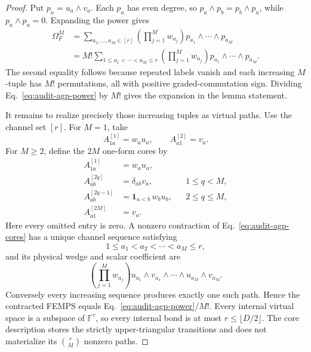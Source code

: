 \documentclass[aps,pra,reprint,superscriptaddress,nofootinbib,longbibliography,showkeys]{revtex4-2}
\theoremstyle{definition}
\begin{document}
\begin{proof}
Put $p_a=u_a\wedge v_a$.  Each $p_a$ has even degree, so
$p_a\wedge p_b=p_b\wedge p_a$, while $p_a\wedge p_a=0$.  Expanding the power
gives
\begin{align}
\Omega_F^M
&=\sum_{a_1,\ldots,a_M\in[r]}
\left(\prod_{j=1}^{M}w_{a_j}\right)
p_{a_1}\wedge\cdots\wedge p_{a_M}\nonumber\\
&=M!\sum_{1\le a_1<\cdots<a_M\le r}
\left(\prod_{j=1}^{M}w_{a_j}\right)
p_{a_1}\wedge\cdots\wedge p_{a_M}.
\label{eq:audit-agp-power}
\end{align}
The second equality follows because repeated labels vanish and each increasing
$M$-tuple has $M!$ permutations, all with positive graded-commutation sign.
Dividing Eq.~\eqref{eq:audit-agp-power} by $M!$ gives the expansion in the
lemma statement.

It remains to realize precisely those increasing tuples as virtual paths.
Use the channel set $[r]$.  For $M=1$, take
\begin{equation}
A^{[1]}_{1a}=w_au_a,\qquad A^{[2]}_{a1}=v_a.
\end{equation}
For $M\ge2$, define the $2M$ one-form cores by
\begin{align}
A^{[1]}_{1a}&=w_au_a,\nonumber\\
A^{[2q]}_{ab}&=\delta_{ab}v_a,
&&1\le q<M,\nonumber\\
A^{[2q-1]}_{ab}&=\mathbf 1_{a<b}\,w_bu_b,
&&2\le q\le M,\nonumber\\
A^{[2M]}_{a1}&=v_a.
\label{eq:audit-agp-cores}
\end{align}
Here every omitted entry is zero.  A nonzero contraction of
Eq.~\eqref{eq:audit-agp-cores} has a unique channel sequence satisfying
\begin{equation}
1\le a_1<a_2<\cdots<a_M\le r,
\end{equation}
and its physical wedge and scalar coefficient are
\begin{equation}
\left(\prod_{j=1}^{M}w_{a_j}\right)
u_{a_1}\wedge v_{a_1}\wedge\cdots\wedge
u_{a_M}\wedge v_{a_M}.
\end{equation}
Conversely every increasing sequence produces exactly one such path.  Hence
the contracted FEMPS equals Eq.~\eqref{eq:audit-agp-power}/$M!$.  Every
internal virtual space is a subspace of $\mathbb F^r$, so every internal bond
is at most $r\le\lfloor D/2\rfloor$.  The core description stores the
strictly upper-triangular transitions and does not materialize its
$\binom rM$ nonzero paths.
\end{proof}
\end{document}
